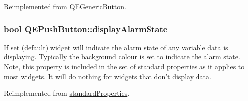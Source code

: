 Reimplemented from \hyperlink{classQEGenericButton}{QEGenericButton}.

\hypertarget{classQEPushButton_a7753c754e5d4a8c9e0d247d7b94a649f}{
\subsubsection[{displayAlarmState}]{\setlength{\rightskip}{0pt plus 5cm}bool QEPushButton::displayAlarmState}}
\label{classQEPushButton_a7753c754e5d4a8c9e0d247d7b94a649f}
If set (default) widget will indicate the alarm state of any variable data is displaying. Typically the background colour is set to indicate the alarm state. Note, this property is included in the set of standard properties as it applies to most widgets. It will do nothing for widgets that don't display data. 

Reimplemented from \hyperlink{classstandardProperties}{standardProperties}.

